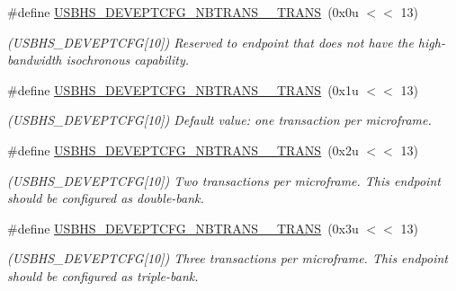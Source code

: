 \begin{DoxyCompactItemize}
\#define \mbox{\hyperlink{group__SAME70__USBHS_ga43b2db530b01ee6470bfc7054287b538}{U\+S\+B\+H\+S\+\_\+\+D\+E\+V\+E\+P\+T\+C\+F\+G\+\_\+\+N\+B\+T\+R\+A\+N\+S\+\_\+\_\+\+T\+R\+A\+NS}}~(0x0u $<$$<$ 13)
\begin{DoxyCompactList}\small\item\em (U\+S\+B\+H\+S\+\_\+\+D\+E\+V\+E\+P\+T\+C\+FG\mbox{[}10\mbox{]}) Reserved to endpoint that does not have the high-\/bandwidth isochronous capability. \end{DoxyCompactList}\item 
\mbox{\label{group__SAME70__USBHS_ga6db69fd65f655a87942c2302b78e888c}} 
\#define \mbox{\hyperlink{group__SAME70__USBHS_ga6db69fd65f655a87942c2302b78e888c}{U\+S\+B\+H\+S\+\_\+\+D\+E\+V\+E\+P\+T\+C\+F\+G\+\_\+\+N\+B\+T\+R\+A\+N\+S\+\_\+\_\+\+T\+R\+A\+NS}}~(0x1u $<$$<$ 13)
\begin{DoxyCompactList}\small\item\em (U\+S\+B\+H\+S\+\_\+\+D\+E\+V\+E\+P\+T\+C\+FG\mbox{[}10\mbox{]}) Default value\+: one transaction per microframe. \end{DoxyCompactList}\item 
\mbox{\label{group__SAME70__USBHS_ga344108e9f3093a59992c4b40dcf55d85}} 
\#define \mbox{\hyperlink{group__SAME70__USBHS_ga344108e9f3093a59992c4b40dcf55d85}{U\+S\+B\+H\+S\+\_\+\+D\+E\+V\+E\+P\+T\+C\+F\+G\+\_\+\+N\+B\+T\+R\+A\+N\+S\+\_\+\_\+\+T\+R\+A\+NS}}~(0x2u $<$$<$ 13)
\begin{DoxyCompactList}\small\item\em (U\+S\+B\+H\+S\+\_\+\+D\+E\+V\+E\+P\+T\+C\+FG\mbox{[}10\mbox{]}) Two transactions per microframe. This endpoint should be configured as double-\/bank. \end{DoxyCompactList}\item 
\mbox{\label{group__SAME70__USBHS_ga668cdeba374eaa8796bc36556b33d305}} 
\#define \mbox{\hyperlink{group__SAME70__USBHS_ga668cdeba374eaa8796bc36556b33d305}{U\+S\+B\+H\+S\+\_\+\+D\+E\+V\+E\+P\+T\+C\+F\+G\+\_\+\+N\+B\+T\+R\+A\+N\+S\+\_\+\_\+\+T\+R\+A\+NS}}~(0x3u $<$$<$ 13)
\begin{DoxyCompactList}\small\item\em (U\+S\+B\+H\+S\+\_\+\+D\+E\+V\+E\+P\+T\+C\+FG\mbox{[}10\mbox{]}) Three transactions per microframe. This endpoint should be configured as triple-\/bank. \end{DoxyCompactList}\item 

\end{DoxyCompactItemize}
